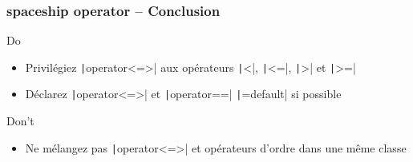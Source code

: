 \documentclass[C++.tex]{subfiles}
\begin{document}
\begin{frame}[fragile]
\end{frame}

\begin{frame}[fragile]
	\frametitle{spaceship operator -- Conclusion}
	\begin{exampleblock}{Do}
		\begin{itemize}
			\item Privilégiez \texttt|operator<=>| aux opérateurs \texttt|<|, \texttt|<=|, \texttt|>| et \texttt|>=|
			\item Déclarez \texttt|operator<=>| et \texttt|operator==| \texttt|=default| si possible
		\end{itemize}
	\end{exampleblock}

	\begin{alertblock}{Don't}
		\begin{itemize}
			\item Ne mélangez pas \texttt|operator<=>| et opérateurs d'ordre dans une même classe
		\end{itemize}
	\end{alertblock}
\end{frame}
\end{document}
